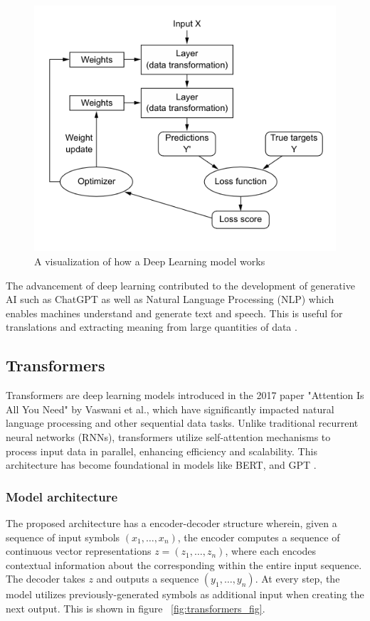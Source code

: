 \documentclass[licencjacka,en]{pracamgr}
\begin{document}
\begin{figure}
    \centering
    \includegraphics[width=0.5\linewidth]{bachelor_images/nn_function.png}
    \caption{A visualization of how a Deep Learning model works \cite{francuz_9}}
    \label{fig:nn_function}
\end{figure}

The advancement of deep learning contributed to the development of generative AI such as ChatGPT as well as Natural Language Processing (NLP) which enables machines understand and generate text and speech. This is useful for translations and extracting meaning from large quantities of data \cite{ibm_dl}.

\subsection{Transformers}
Transformers are deep learning models introduced in the 2017 paper "Attention Is All You Need" \cite{attention} by Vaswani et al., which have significantly impacted natural language processing and other sequential data tasks. Unlike traditional recurrent neural networks (RNNs), transformers utilize self-attention mechanisms to process input data in parallel, enhancing efficiency and scalability. This architecture has become foundational in models like BERT, and GPT \cite{medium_t}.

\subsubsection{Model architecture}
The proposed architecture has a encoder-decoder structure wherein, given a sequence of input symbols $ (x_1, … , x_n) $, the encoder computes a sequence of continuous vector representations $ z = (z_1, … , z_n) $, where each encodes contextual information about the corresponding within the entire input sequence. The decoder takes $ z $ and outputs a sequence $ (y_1, … , y_n) $. At every step, the model utilizes previously-generated symbols as additional input when creating the next output. This is shown in figure ~\ref{fig:transformers_fig}.
\end{document}
